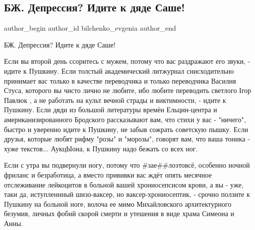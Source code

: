  
 
 
 
 
 
\subsection{БЖ. Депрессия? Идите к дяде Саше!}
\label{sec:24_11_2021.fb.bilchenko_evgenia.1.depressia_djadja_sasha}
 
\ifcmt
 author_begin
   author_id bilchenko_evgenia
 author_end
\fi

БЖ. Депрессия? Идите к дяде Саше!

Если вы второй день ссоритесь с мужем, потому что вас раздражают его звуки, -
идите к Пушкину. Если толстый академический литжурнал снисходительно принимает
вас только в качестве переводчика и только переводчика Василия Стуса, которого
вы чисто лично не любите, ибо любите переводить светлого Ігор Павлюк , а не
работать на культ вечной страды и виктимности, - идите к Пушкину. Если дяди из
большой литературы времён Ельцин-центра и американизированного Бродского
рассказывают вам, что стихи у вас - "ничего", быстро и уверенно идите к
Пушкину, не забыв сожрать советскую пышку. Если друзья, которые любят рифму
"розы" и "морозы", говорят вам, что ваша тоника - хуже текстов... АукцЫона, к
Пушкину надо бежать со всех ног. 



Если с утра вы подвернули ногу, потому что
\#зае\#\#лоэтовсё, особенно ночной фриланс и безработица, а вместо прививки вас
ждёт опять месячное отслеживание лейкоцитов в больной вашей хрониосепсисом
крови, а вы - уже, таки да, иступленнный шизо-ваксер, но ваксер-хрониосептик, -
срочно ползите к Пушкину на больной ноге, волоча ее мимо Михайловского
архитектурного безумия, личных фобий скорой смерти и утешения в виде храма
Симеона и Анны. 


